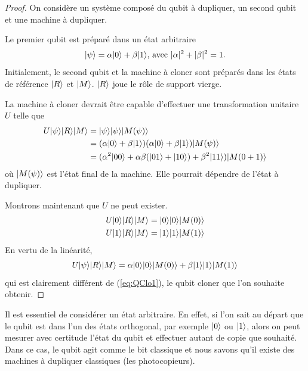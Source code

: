 \begin{proof}
On considère un système composé du qubit à dupliquer, un second qubit et une
machine à dupliquer.

Le premier qubit est préparé dans un état arbitraire%
\begin{equation}
\vert\psi\rangle=\alpha\vert0\rangle+\beta\vert1\rangle\text{, avec }|\alpha|^{2}+|\beta|^{2}=1.
\end{equation}
Initialement, le second qubit et la machine à cloner sont préparés dans les
états de référence $\vert R\rangle$ et $\vert M\rangle$. $\vert R\rangle$ joue le rôle de support
vierge.

La machine à cloner devrait être capable d'effectuer une transformation
unitaire $U$ telle que%
\begin{equation}
\label{eq:QClo1}
\begin{split}
U\vert\psi\rangle\vert R\rangle\vert M\rangle &  =\vert\psi\rangle\vert\psi\rangle\vert M(\psi)\rangle\\
&  =(\alpha\vert0\rangle+\beta\vert1\rangle)(\alpha\vert0\rangle+\beta\vert1\rangle)\vert M(\psi)\rangle\\
&  =(\alpha^{2}\vert00\rangle+\alpha\beta(\vert01\rangle+\vert10\rangle)+\beta^{2}\vert11\rangle)
\vert M(0+1)\rangle
\end{split}
\end{equation}
où $\vert M(\psi)\rangle$ est l'état final de la machine. Elle pourrait dépendre de
l'état à dupliquer.

Montrons maintenant que $U$ ne peut exister.%
\begin{subequations}%
\begin{align}
U\vert0\rangle\vert R\rangle\vert M\rangle &  =\vert0\rangle\vert0\rangle\vert M(0)\rangle\\
U\vert1\rangle\vert R\rangle\vert M\rangle &  =\vert1\rangle\vert1\rangle\vert M(1)\rangle
\end{align}%
\end{subequations}%
En vertu de la linéarité,%
\begin{equation}
U\vert\psi\rangle\vert R\rangle\vert M\rangle=\alpha\vert0\rangle\vert0\rangle\vert M(0)\rangle+\beta\vert1\rangle
\vert1\rangle\vert M(1)\rangle
\end{equation}
qui est clairement différent de (\ref{eq:QClo1}), le qubit cloner que l'on
souhaite obtenir.
\end{proof}

Il est essentiel de considérer un état arbitraire. En effet, si l'on sait au
départ que le qubit est dans l'un des états orthogonal, par exemple $\vert0\rangle$ ou
$\vert1\rangle $, alors on peut mesurer avec certitude l'état du qubit et effectuer
autant de copie que souhaité. Dans ce cas, le qubit agit comme le bit classique
et nous savons qu'il existe des machines à dupliquer classiques (les
photocopieurs).

